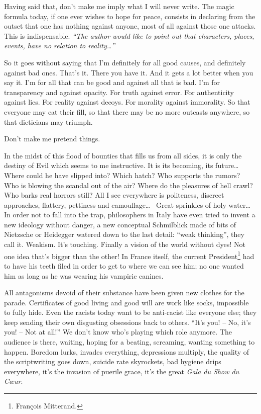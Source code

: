 Having said that, don't make me imply what I will never write. The magic formula today, if one ever wishes to hope for peace, consists in declaring from the outset that one has nothing against anyone, most of all against those one attacks. This is indispensable. \textit{``The author would like to point out that characters, places, events, have no relation to reality\dots''}

So it goes without saying that I'm definitely for all good causes, and definitely against bad ones. That's it. There you have it. And it gets a lot better when you say it. I'm for all that can be good and against all that is bad. I'm for transparency and against opacity. For truth against error. For authenticity against lies. For reality against decoys. For morality against immorality. So that everyone may eat their fill, so that there may be no more outcasts anywhere, so that dieticians may triumph.

Don't make me pretend things.

In the midst of this flood of bounties that fills us from all sides, it is only the destiny of Evil which seems to me instructive. It is its becoming, its future\dots~ Where could he have slipped into? Which hatch? Who supports the rumors?  Who is blowing the scandal out of the air? Where do the pleasures of hell crawl?  Who barks real horrors still?  All I see everywhere is politeness, discreet approaches, flattery, pettiness and camouflage\dots~ Great sprinkles of holy water\dots~ In order not to fall into the trap, philosophers in Italy have even tried to invent a new ideology without danger, a new conceptual Schmilblick made of bits of Nietzsche or Heidegger watered down to the last detail: ``weak thinking'', they call it. Weakism. It's touching. Finally a vision of the world without dyes! Not one idea that's bigger than the other! In France itself, the current President\footnote{Fran\c{c}ois Mitterand.} had to have his teeth filed in order to get to where we can see him; no one wanted him as long as he was wearing his vampiric canines.

All antagonisms devoid of their substance have been given new clothes for the parade. Certificates of good living and good will are work like socks, impossible to fully hide. Even the racists today want to be anti-racist like everyone else; they keep sending their own disgusting obsessions back to others. ``It's you! -- No, it's you! -- Not at all!''  We don't know who's playing which role anymore. The audience is there, waiting, hoping for a beating, screaming, wanting something to happen. Boredom lurks, invades everything, depressions multiply, the quality of the scriptwriting goes down, suicide rate skyrockets, bad hygiene drips everywhere, it's the invasion of puerile grace, it's the great \textit{Gala du Show du Cœur}.

